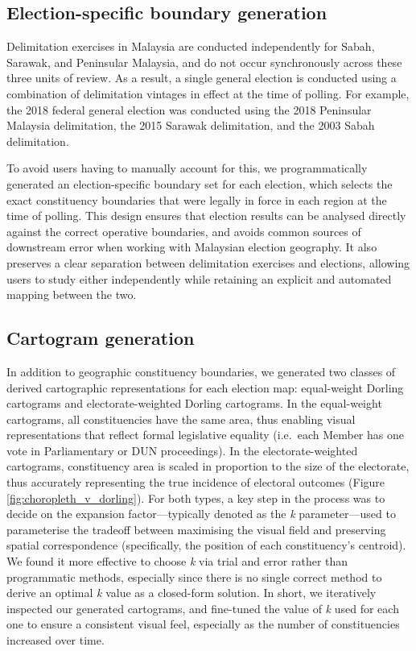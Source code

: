 \documentclass[11pt]{article}
\begin{document}
\subsection*{Election-specific boundary generation}

Delimitation exercises in Malaysia are conducted independently for Sabah, Sarawak, and Peninsular Malaysia, and do not occur synchronously across these three units of review. As a result, a single general election is conducted using a combination of delimitation vintages in effect at the time of polling. For example, the 2018 federal general election was conducted using the 2018 Peninsular Malaysia delimitation, the 2015 Sarawak delimitation, and the 2003 Sabah delimitation.

To avoid users having to manually account for this, we programmatically generated an election-specific boundary set for each election, which selects the exact constituency boundaries that were legally in force in each region at the time of polling. This design ensures that election results can be analysed directly against the correct operative boundaries, and avoids common sources of downstream error when working with Malaysian election geography. It also preserves a clear separation between delimitation exercises and elections, allowing users to study either independently while retaining an explicit and automated mapping between the two.

\subsection*{Cartogram generation}

In addition to geographic constituency boundaries, we generated two classes of derived cartographic representations for each election map: equal-weight Dorling cartograms and electorate-weighted Dorling cartograms.\cite{dorling2011area} In the equal-weight cartograms, all constituencies have the same area, thus enabling visual representations that reflect formal legislative equality (i.e.\ each Member has one vote in Parliamentary or DUN proceedings). In the electorate-weighted cartograms, constituency area is scaled in proportion to the size of the electorate, thus accurately representing the true incidence of electoral outcomes (Figure \ref{fig:choropleth_v_dorling}). For both types, a key step in the process was to decide on the expansion factor---typically denoted as the \textit{k} parameter---used to parameterise the tradeoff between maximising the visual field and preserving spatial correspondence (specifically, the position of each constituency's centroid). We found it more effective to choose \textit{k} via trial and error rather than programmatic methods, especially since there is no single correct method to derive an optimal \textit{k} value as a closed-form solution. In short, we iteratively inspected our generated cartograms, and fine-tuned the value of \textit{k} used for each one to ensure a consistent visual feel, especially as the number of constituencies increased over time.
\end{document}
